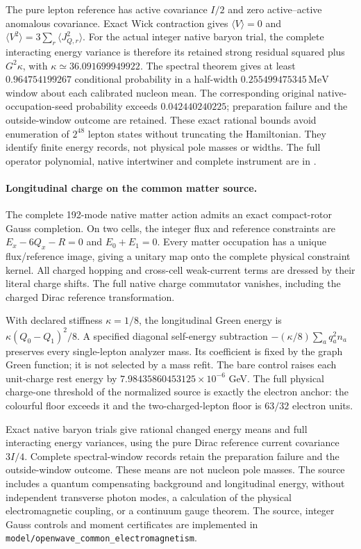 The pure lepton reference has active covariance $I/2$ and zero
active--active anomalous covariance. Exact Wick contraction gives
$\langle V\rangle=0$ and
$\langle V^2\rangle=3\sum_r\langle J_{Q,r}^2\rangle$.
For the actual integer native baryon trial, the complete interacting
energy variance is therefore its retained strong residual squared plus
$G^2\kappa$, with $\kappa\simeq36.091699949922$.
The spectral theorem gives at least $0.964754199267$
conditional probability in a half-width $0.255499475345\,\mathrm{MeV}$
window about each calibrated nucleon mean. The corresponding original
native-occupation-seed probability exceeds $0.042440240225$; preparation
failure and the outside-window outcome are retained.
These exact rational bounds avoid enumeration of $2^{48}$ lepton states
without truncating the Hamiltonian. They identify finite energy records,
not physical pole masses or widths. The full operator polynomial, native
intertwiner and complete instrument are in
.


\paragraph{Longitudinal charge on the common matter source.}
The complete 192-mode native matter action admits an exact compact-rotor
Gauss completion. On two cells, the integer flux and reference constraints
are $E_x-6Q_x-R=0$ and $E_0+E_1=0$. Every matter occupation has a unique
flux/reference image, giving a unitary map onto the complete physical
constraint kernel. All charged hopping and cross-cell weak-current terms
are dressed by their literal charge shifts. The full native charge
commutator vanishes, including the charged Dirac reference transformation.

With declared stiffness $\kappa=1/8$, the longitudinal Green energy is
$\kappa(Q_0-Q_1)^2/8$. A specified diagonal self-energy subtraction
$-(\kappa/8)\sum_aq_a^2n_a$ preserves every single-lepton analyzer mass.
Its coefficient is fixed by the graph Green function; it is not selected
by a mass refit. The bare control raises each unit-charge rest energy by
$7.98435860453125\times10^{-6}$ GeV. The full physical charge-one threshold
of the normalized source is exactly the electron anchor: the colourful
floor exceeds it and the two-charged-lepton floor is $63/32$ electron units.

Exact native baryon trials give rational changed energy means and
full interacting energy variances, using the pure Dirac reference current
covariance $3I/4$. Complete spectral-window records retain the preparation
failure and the outside-window outcome. These means are not nucleon pole
masses. The source includes a quantum compensating background and
longitudinal energy, without independent transverse photon modes, a
calculation of the physical electromagnetic coupling, or a continuum gauge
theorem. The source, integer Gauss controls and moment certificates are
implemented in \texttt{model/openwave\_common\_electromagnetism}.

